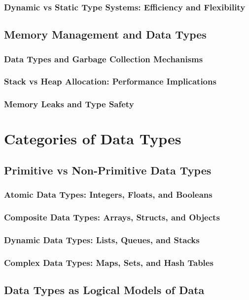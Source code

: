 \documentclass[12pt, oneside]{book}
\begin{document}
\subsubsection{Dynamic vs Static Type Systems: Efficiency and Flexibility}
\subsection{Memory Management and Data Types}
\subsubsection{Data Types and Garbage Collection Mechanisms}
\subsubsection{Stack vs Heap Allocation: Performance Implications}
\subsubsection{Memory Leaks and Type Safety}

\section{Categories of Data Types}
\subsection{Primitive vs Non-Primitive Data Types}
\subsubsection{Atomic Data Types: Integers, Floats, and Booleans}
\subsubsection{Composite Data Types: Arrays, Structs, and Objects}
\subsubsection{Dynamic Data Types: Lists, Queues, and Stacks}
\subsubsection{Complex Data Types: Maps, Sets, and Hash Tables}
\subsection{Data Types as Logical Models of Data}
\end{document}
